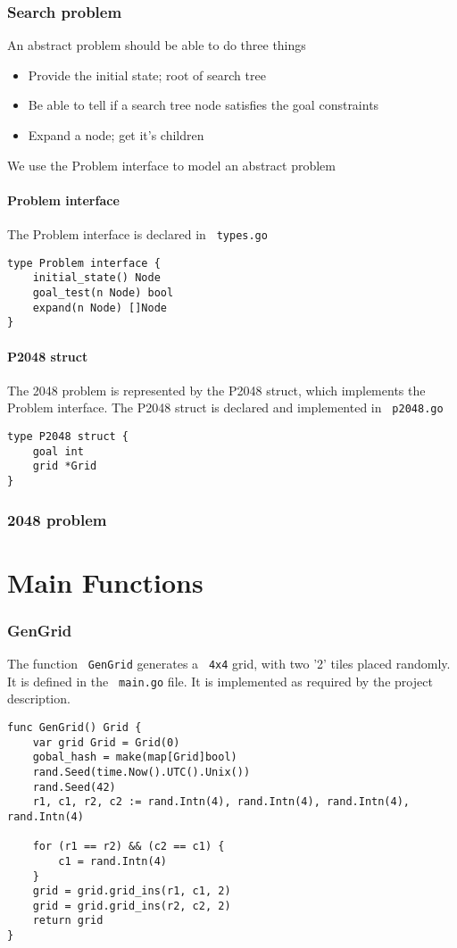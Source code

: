 \documentclass[14pt,a4paper]{report}
\begin{document}
\section{Search problem}
An abstract problem should be able to do three things
\begin{itemize}
\item Provide the initial state; root of search tree
\item Be able to tell if a search tree node satisfies the goal constraints
\item Expand a node; get it's children
\end{itemize}
We use the Problem interface to model an abstract problem

\subsection{Problem interface}
The Problem interface is declared in \verb+ types.go+ 
\begin{lstlisting}
type Problem interface {
    initial_state() Node
    goal_test(n Node) bool
    expand(n Node) []Node
}
\end{lstlisting}
\subsection{P2048 struct}
The 2048 problem is represented by the P2048 struct, which implements the Problem interface.
The P2048 struct is declared and implemented in \verb+ p2048.go+
\begin{lstlisting}
type P2048 struct {
    goal int
    grid *Grid
}
\end{lstlisting}
\vfill

\section{2048 problem}
    
\part{Main Functions}
\section{GenGrid}
The function \verb+ GenGrid+ generates a \verb+ 4x4+ grid, with two '2' tiles placed randomly.
It is defined in the \verb+ main.go+ file. It is implemented as required by the project description.
\begin{lstlisting}
func GenGrid() Grid {
    var grid Grid = Grid(0)
    gobal_hash = make(map[Grid]bool)
    rand.Seed(time.Now().UTC().Unix())
    rand.Seed(42)
    r1, c1, r2, c2 := rand.Intn(4), rand.Intn(4), rand.Intn(4), rand.Intn(4)

    for (r1 == r2) && (c2 == c1) {
        c1 = rand.Intn(4)
    }
    grid = grid.grid_ins(r1, c1, 2)
    grid = grid.grid_ins(r2, c2, 2)
    return grid
}
\end{lstlisting}
\end{document}
